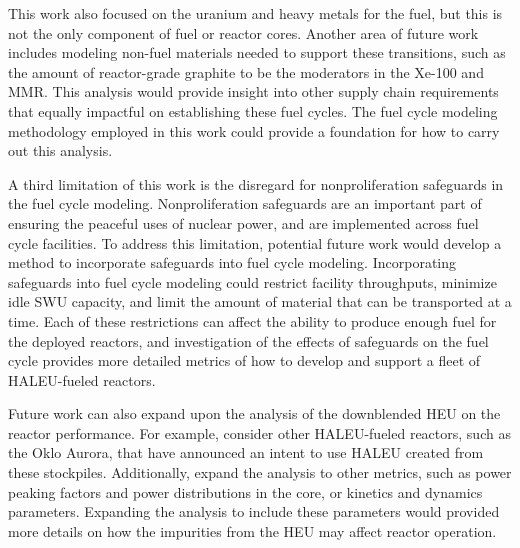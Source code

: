 This work also focused on the uranium and heavy metals for 
the fuel, but this is not the only component of fuel or reactor 
cores. Another area of future work includes modeling non-fuel 
materials needed to support these transitions, such as the amount 
of reactor-grade graphite 
to be the moderators in the Xe-100 and \gls{MMR}. This analysis would 
provide insight into other supply chain requirements that equally 
impactful on establishing these fuel cycles. The fuel cycle modeling 
methodology employed in this work could provide a foundation 
for how to carry out this analysis. 

A third limitation of this work is the disregard for nonproliferation 
safeguards in the fuel cycle modeling. Nonproliferation safeguards 
are an important part of ensuring the peaceful uses of nuclear 
power, and are implemented across fuel cycle facilities. To 
address this limitation, potential future work would develop 
a method to incorporate safeguards into fuel cycle modeling. 
Incorporating safeguards into fuel cycle modeling could 
restrict facility throughputs, minimize idle \gls{SWU} 
capacity, and limit the amount of material that can be transported 
at a time. Each of these restrictions can affect the ability 
to produce enough fuel for the deployed reactors, and investigation 
of the effects of safeguards on the fuel cycle provides more 
detailed metrics of how to develop and support a fleet of 
\gls{HALEU}-fueled reactors. 

Future work can also expand upon the analysis of the downblended 
\gls{HEU} on the reactor performance. For example, consider other 
\gls{HALEU}-fueled 
reactors, such as the Oklo Aurora, that have announced an intent to 
use \gls{HALEU} created from these stockpiles. Additionally, expand 
the analysis to other metrics, such as power peaking factors and 
power distributions in the core, or kinetics and dynamics parameters. 
Expanding the analysis to include these parameters would provided 
more details on how the impurities from the \gls{HEU} may 
affect reactor operation.